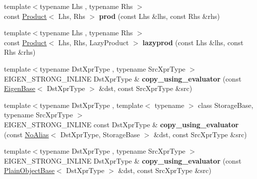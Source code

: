 \begin{DoxyCompactItemize}
\item 
\mbox{\label{namespace_eigen_a6dd0fb5de9a0e3196003928a28bb151b}} 
{\footnotesize template$<$typename Lhs , typename Rhs $>$ }\\const \hyperlink{group___core___module_class_eigen_1_1_product}{Product}$<$ Lhs, Rhs $>$ {\bfseries prod} (const Lhs \&lhs, const Rhs \&rhs)
\item 
\mbox{\label{namespace_eigen_ad7aeb3f2ecc6d518b24ee50c423519ca}} 
{\footnotesize template$<$typename Lhs , typename Rhs $>$ }\\const \hyperlink{group___core___module_class_eigen_1_1_product}{Product}$<$ Lhs, Rhs, Lazy\+Product $>$ {\bfseries lazyprod} (const Lhs \&lhs, const Rhs \&rhs)
\item 
\mbox{\label{namespace_eigen_a87e2fa753412fadca68692dab53afa7b}} 
{\footnotesize template$<$typename Dst\+Xpr\+Type , typename Src\+Xpr\+Type $>$ }\\E\+I\+G\+E\+N\+\_\+\+S\+T\+R\+O\+N\+G\+\_\+\+I\+N\+L\+I\+NE Dst\+Xpr\+Type \& {\bfseries copy\+\_\+using\+\_\+evaluator} (const \hyperlink{group___core___module_struct_eigen_1_1_eigen_base}{Eigen\+Base}$<$ Dst\+Xpr\+Type $>$ \&dst, const Src\+Xpr\+Type \&src)
\item 
\mbox{\label{namespace_eigen_ab331d97c9493c5112e505623135d3d71}} 
{\footnotesize template$<$typename Dst\+Xpr\+Type , template$<$ typename $>$ class Storage\+Base, typename Src\+Xpr\+Type $>$ }\\E\+I\+G\+E\+N\+\_\+\+S\+T\+R\+O\+N\+G\+\_\+\+I\+N\+L\+I\+NE const Dst\+Xpr\+Type \& {\bfseries copy\+\_\+using\+\_\+evaluator} (const \hyperlink{group___core___module_class_eigen_1_1_no_alias}{No\+Alias}$<$ Dst\+Xpr\+Type, Storage\+Base $>$ \&dst, const Src\+Xpr\+Type \&src)
\item 
\mbox{\label{namespace_eigen_a61562a02f90df062ee87a6afd6bdd0af}} 
{\footnotesize template$<$typename Dst\+Xpr\+Type , typename Src\+Xpr\+Type $>$ }\\E\+I\+G\+E\+N\+\_\+\+S\+T\+R\+O\+N\+G\+\_\+\+I\+N\+L\+I\+NE Dst\+Xpr\+Type \& {\bfseries copy\+\_\+using\+\_\+evaluator} (const \hyperlink{class_eigen_1_1_plain_object_base}{Plain\+Object\+Base}$<$ Dst\+Xpr\+Type $>$ \&dst, const Src\+Xpr\+Type \&src)
\item 

\end{DoxyCompactItemize}
